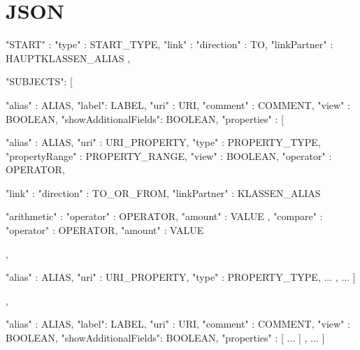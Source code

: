 \section*{JSON}

\begin{myVerbatim}
{
  "START" : {
    "type" : START_TYPE, 
    "link" : {
      "direction" : TO, 
      "linkPartner" : HAUPTKLASSEN_ALIAS
    }
  },
  
  "SUBJECTS": [  
    {
      "alias" : ALIAS,
      "label": LABEL,
      "uri" : URI,     
      "comment" : COMMENT,
      "view" : BOOLEAN,
      "showAdditionalFields": BOOLEAN,
      "properties" : [

        { "alias" : ALIAS,
	  "uri" : URI_PROPERTY,
	  "type" : PROPERTY_TYPE,     
          "propertyRange" : PROPERTY_RANGE,          
          "view" : BOOLEAN,
          "operator" : OPERATOR,
          
          "link" : {
	    "direction" : TO_OR_FROM, 
	    "linkPartner" : KLASSEN_ALIAS
	  }

          "arithmetic" : {
	    "operator" : OPERATOR, 
	    "amount" : VALUE
	  },
          "compare" : {
	    "operator" : OPERATOR, 
	    "amount" : VALUE
	  }
        },

        { "alias" : ALIAS,
	  "uri" : URI_PROPERTY,
	  "type" : PROPERTY_TYPE,
          ...
        }, 
	  ...
      ]     
    },                       

    {
      "alias" : ALIAS,
      "label": LABEL,
      "uri" : URI,     
      "comment" : COMMENT,
      "view" : BOOLEAN,
      "showAdditionalFields": BOOLEAN,
      "properties" : [ ... ]
    },
      ...
  ]
}
\end{myVerbatim}